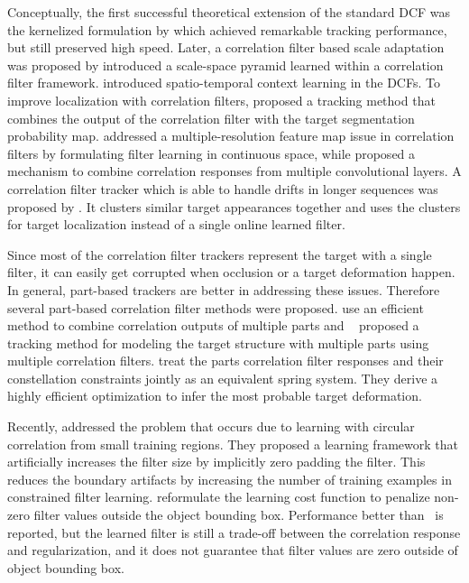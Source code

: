 \documentclass[twocolumn]{article}
\begin{document}
Conceptually, the first successful theoretical extension of the standard DCF was the kernelized formulation by \cite{henriques2015tracking} which achieved remarkable tracking performance, but still preserved high speed. Later, a correlation filter based scale adaptation was proposed by \cite{danelljan2014accurate} introduced a scale-space pyramid learned within a correlation filter framework. \cite{zhang_stc_eccv2014} introduced spatio-temporal context learning in the DCFs.
To improve localization with correlation filters, \cite{staple_cvpr2016} proposed a tracking method that combines the output of the correlation filter with the target segmentation probability map. \cite{danelljan_eccv2016_ccot} addressed a multiple-resolution feature map issue in correlation filters by formulating filter learning in continuous space, while \cite{qi_hedge_deep_cf} proposed a mechanism to combine correlation responses from multiple convolutional layers. A correlation filter tracker which is able to handle drifts in longer sequences was proposed by \cite{wang_reliable_memories}. It clusters similar target appearances together and uses the clusters for target localization instead of a single online learned filter. 

Since most of the correlation filter trackers represent the target with a single filter, it can easily get corrupted when occlusion or a target deformation happen. In general, part-based trackers are better in addressing these issues. Therefore several part-based correlation filter methods were proposed. \cite{part_cf_cvpr2016} use an efficient method to combine correlation outputs of multiple parts and ~\cite{structural_cf_cvpr2016} proposed a tracking method for modeling the target structure with multiple parts using multiple correlation filters. \cite{lukezic_dpt} treat the parts correlation filter responses and their constellation constraints jointly as an equivalent spring system. They derive a highly efficient optimization to infer the most probable target deformation.

Recently, \cite{cfwlb_cvpr2015} addressed the problem that occurs due to learning with circular correlation from small training regions. They proposed a learning framework that artificially increases the filter size by implicitly zero padding the filter. This reduces the boundary artifacts by increasing the number of training examples in constrained filter learning. \cite{srdcf_iccv2015} reformulate the learning cost function to penalize non-zero filter values outside the object bounding box. Performance better than~\citep{cfwlb_cvpr2015} is reported, but the learned filter is still a trade-off between the correlation response and regularization, and it does not guarantee that filter values are zero outside of object bounding box. 
\end{document}
